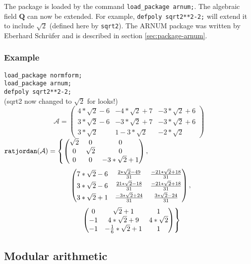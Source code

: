 The package is loaded by the command \texttt{load\_package arnum;}. The algebraic
field $\mathbf{Q}$ can now be extended. For example,
\texttt{defpoly sqrt2**2-2;} will extend it to include ${\sqrt{2}}$ (defined here by
\texttt{sqrt2}). The {\small ARNUM} package was written by Eberhard
Schr\"ufer and is described in section \ref{sec:package-arnum}.

\subsubsection{Example}

\texttt{load\_package normform;} \\
\texttt{load\_package arnum;} \\
\texttt{defpoly sqrt2**2-2;} \\
(sqrt2 now changed to ${\sqrt{2}}$ for looks!)
\[
\mathcal{A} = \begin{pmatrix} 4*{\sqrt{2}}-6 & -4*{\sqrt{2}}+7 &
-3*{\sqrt{2}}+6 \\ 3*{\sqrt{2}}-6 & -3*{\sqrt{2}}+7 & -3*{\sqrt{2}}+6
\\ 3*{\sqrt{2}} & 1-3*{\sqrt{2}} & -2*{\sqrt{2}} \end{pmatrix}
\]
\(
\displaystyle
\texttt{ratjordan}(\mathcal{A}) =
\left\{ \begin{pmatrix} {\sqrt{2}} & 0 & 0 \\ 0 & {\sqrt{2}}
& 0 \\ 0 & 0 & -3*{\sqrt{2}}+1 \end{pmatrix}, \right.
\)
\[
\hspace{0.1in} \left. \begin{pmatrix}
 7*{\sqrt{2}}-6 & \frac{2*{\sqrt{2}}-49}{31} & \frac{-21*{\sqrt{2}}+18}{31} \\[1mm]
 3*{\sqrt{2}}-6 & \frac{21*{\sqrt{2}}-18}{31} & \frac{-21*{\sqrt{2}}+18}{31} \\[1mm]
 3*{\sqrt{2}}+1 & \frac{-3*{\sqrt{2}}+24}{31} & \frac{3*{\sqrt{2}}-24}{31}
 \end{pmatrix}, \right.
\]
\[
\hspace{0.1in} \left. \begin{pmatrix} 0 & {\sqrt{2}}+1 &
1 \\ -1 & 4*{\sqrt{2}}+9 & 4*{\sqrt{2}} \\ -1 & -\frac{1}{6}*{\sqrt{2}}
+1 & 1 \end{pmatrix} \right\}
\]



\subsection{Modular arithmetic}
\label{sec:normform-modular}

